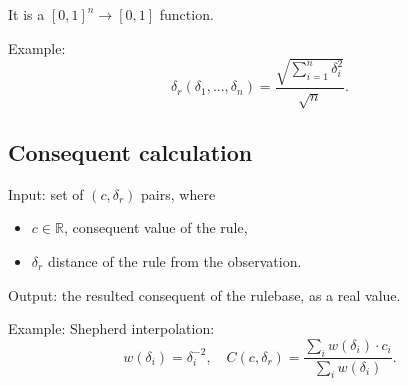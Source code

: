 \documentclass[a4paper,12pt]{article}
\begin{document}
It is a $[0, 1]^n \rightarrow [0, 1]$ function.

\medskip

\noindent Example:
\[
\delta_r(\delta_1, \ldots, \delta_n) = \dfrac{\sqrt{\sum_{i=1}^{n} \delta_i^2}}{\sqrt{n}}.
\]

\subsection{Consequent calculation}

Input: set of $(c, \delta_r)$ pairs, where
\begin{itemize}
	\item $c \in \mathbb{R}$, consequent value of the rule,
	\item $\delta_r$ distance of the rule from the observation.
\end{itemize}
Output: the resulted consequent of the rulebase, as a real value.

\medskip

\noindent Example: Shepherd interpolation: 
\[
w(\delta_i) = \delta_i^{-2},
\quad
C(c, \delta_r) = \dfrac{\sum_i w(\delta_i) \cdot c_i}{\sum_i w(\delta_i)}.
\]
\end{document}
